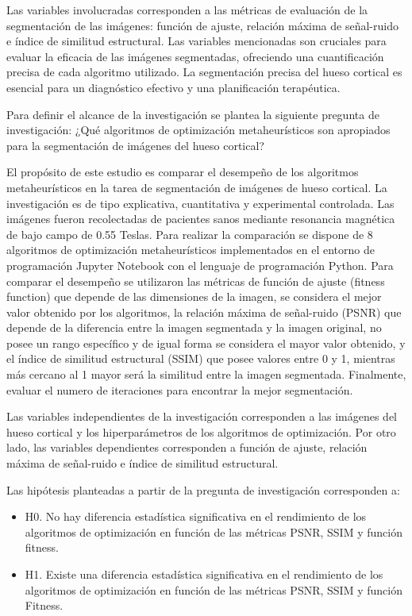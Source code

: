 \documentclass[conference]{IEEEtran}
\begin{document}
\noindent Las variables involucradas corresponden a las métricas de evaluación de la segmentación de las imágenes: función de ajuste, relación máxima de señal-ruido e índice de similitud estructural. Las variables mencionadas son cruciales para evaluar la eficacia de las imágenes segmentadas, ofreciendo una cuantificación precisa de cada algoritmo utilizado. La segmentación precisa del hueso cortical es esencial para un diagnóstico efectivo y una planificación terapéutica.


\noindent Para definir el alcance de la investigación se plantea la siguiente pregunta de investigación: ¿Qué algoritmos de optimización metaheurísticos son apropiados para la segmentación de imágenes del hueso cortical?

\noindent El propósito de este estudio es comparar el desempeño de los algoritmos metaheurísticos en la tarea de segmentación de imágenes de hueso cortical. La investigación es de tipo explicativa, cuantitativa y experimental controlada. Las imágenes fueron recolectadas de pacientes sanos mediante resonancia magnética de bajo campo de 0.55 Teslas. Para realizar la comparación se dispone de 8 algoritmos de optimización metaheurísticos implementados en el entorno de programación Jupyter Notebook con el lenguaje de programación Python. Para comparar el desempeño se utilizaron las métricas de función de ajuste (fitness function) que depende de las dimensiones de la imagen, se considera el mejor valor obtenido por los algoritmos, la relación máxima de señal-ruido (PSNR) que depende de la diferencia entre la imagen segmentada y la imagen original, no posee un rango específico y de igual forma se considera el mayor valor obtenido, y el índice de similitud estructural (SSIM) que posee valores entre 0 y 1, mientras más cercano al 1 mayor será la similitud entre la imagen segmentada. Finalmente, evaluar el numero de iteraciones para encontrar la mejor segmentación.

\noindent Las variables independientes de la investigación corresponden a las imágenes del hueso cortical y los hiperparámetros de los algoritmos de optimización. Por otro lado, las variables dependientes corresponden a  función de ajuste, relación máxima de señal-ruido e índice de similitud estructural.

\noindent Las hipótesis planteadas a partir de la pregunta de investigación corresponden a:
\begin{itemize}
	\item H0. No hay diferencia estadística significativa en el rendimiento de los algoritmos de optimización en función de las métricas PSNR, SSIM y función fitness.
	\item H1. Existe una diferencia estadística significativa en el rendimiento de los algoritmos de optimización en función de las métricas PSNR, SSIM y función Fitness.
\end{itemize}
\end{document}
